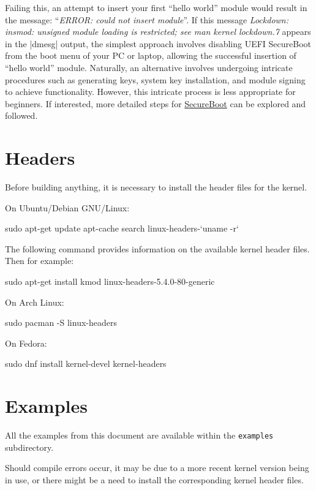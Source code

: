 \documentclass[10pt, oneside]{book}
\begin{document}
\begin{enumerate}
        Failing this, an attempt to insert your first ``hello world'' module would result in the message: ``\emph{ERROR: could not insert module}''.
        If this message \emph{Lockdown: insmod: unsigned module loading is restricted;
        see man kernel lockdown.7} appears in the \sh|dmesg| output,
        the simplest approach involves disabling UEFI SecureBoot from the boot menu of your PC or laptop,
        allowing the successful insertion of ``hello world'' module.
        Naturally, an alternative involves undergoing intricate procedures such as generating keys, system key installation,
        and module signing to achieve functionality.
        However, this intricate process is less appropriate for beginners. If interested,
        more detailed steps for \href{https://wiki.debian.org/SecureBoot}{SecureBoot} can be explored and followed.
\end{enumerate}

\section{Headers}
\label{sec:headers}
Before building anything, it is necessary to install the header files for the kernel.

On Ubuntu/Debian GNU/Linux:
\begin{codebash}
sudo apt-get update
apt-cache search linux-headers-`uname -r`
\end{codebash}

The following command provides information on the available kernel header files.
Then for example:
\begin{codebash}
sudo apt-get install kmod linux-headers-5.4.0-80-generic
\end{codebash}

On Arch Linux:
\begin{codebash}
sudo pacman -S linux-headers
\end{codebash}

On Fedora:
\begin{codebash}
sudo dnf install kernel-devel kernel-headers
\end{codebash}

\section{Examples}
\label{sec:examples}
All the examples from this document are available within the \verb|examples| subdirectory.

Should compile errors occur, it may be due to a more recent kernel version being in use,
or there might be a need to install the corresponding kernel header files.
\end{document}
